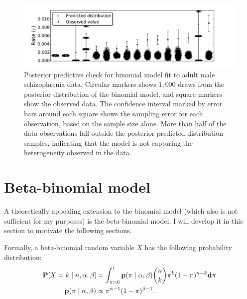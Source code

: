 \begin{figure}[ht]
\begin{center}
\includegraphics[width=\textwidth]{binomial-model-ppc.pdf}
\caption{Posterior predictive check for binomial model fit to adult
  male schizophrenia data.  Circular markers shows $1,000$ draws from
  the posterior distribution of the binomial model, and square markers
  show the observed data.  The confidence interval marked by error
  bars around each square shows the sampling error for each
  observation, based on the sample size alone. More than half of the
  data observations fall outside the posterior predicted distribution
  samples, indicating that the model is not capturing the
  heterogeneity observed in the data.}
\label{rate-model-binom-ppc}
\end{center}
\end{figure}


\section{Beta-binomial model}
\label{beta-binomial-model}
A theoretically appealing extension to the binomial model (which also
is not sufficient for my purposes) is the beta-binomial model.  I will
develop it in this section to motivate the following sections.

Formally, a beta-binomial random variable $X$ has the following
probability distribution:
\begin{align*}
\mathbf{P}[X = k\;|\; n, \alpha, \beta]  &= \int_{\pi=0}^1 \mathbf{p}(\pi\;|\; \alpha, \beta) \binom{n}{k}\pi^k(1-\pi)^{n-k} \mathbf{d}\pi\\
\mathbf{p}(\pi\;|\; \alpha, \beta) &\propto \pi^{\alpha-1}(1-\pi)^{\beta-1}.
\end{align*}

